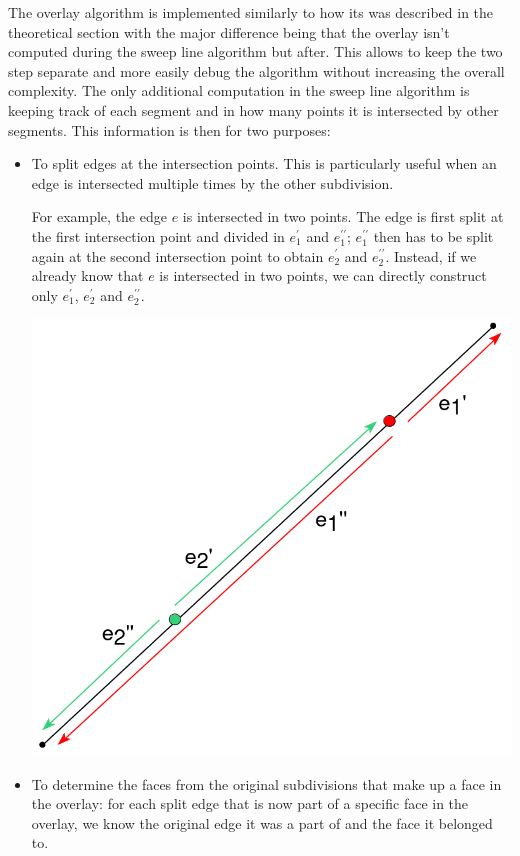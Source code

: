 The overlay algorithm is implemented similarly to how its was described in the theoretical section with the major difference being that the overlay isn't computed during the sweep line algorithm but after. This allows to keep the two step separate and more easily debug the algorithm without increasing the overall complexity. The only additional computation in the sweep line algorithm is keeping track of each segment and in how many points it is intersected by other segments. This information is then for two purposes:
\begin{itemize}
    \item To split edges at the intersection points. This is particularly useful when an edge is intersected multiple times by the other subdivision.
          \hfill \break
          \begin{minipage}{0.7\linewidth}
              For example, the edge $e$ is intersected in two points. The edge is first split at the first intersection point and divided in $e_1^{\prime}$ and $e_1^{\prime\prime}$; $e_1^{\prime\prime}$ then has to be split again at the second intersection point to obtain $e_2^{\prime}$ and $e_2^{\prime\prime}$. Instead, if we already know that $e$ is intersected in two points, we can directly construct only $e_1^{\prime}$, $e_2^{\prime}$ and $e_2^{\prime\prime}$.
          \end{minipage}
          \begin{minipage}{0.3\linewidth}
              \includegraphics[width=\linewidth]{images/split.png}
          \end{minipage}
    \item To determine the faces from the original subdivisions that make up a face in the overlay: for each split edge that is now part of a specific face in the overlay, we know the original edge it was a part of and the face it belonged to.
\end{itemize}

